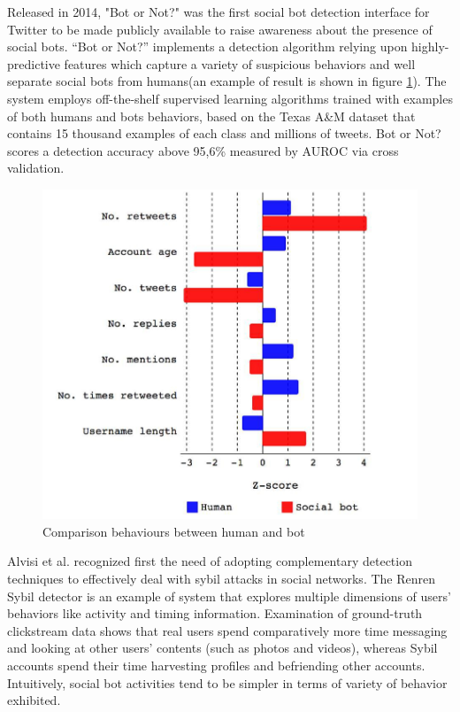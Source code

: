 \documentclass[conference, onecolumn]{IEEEtran}
\begin{document}
Released in 2014, "Bot or Not?" was the first social bot detection interface for Twitter to be made publicly available to raise awareness about the presence of social bots. “Bot or Not?” implements a detection algorithm relying upon highly-predictive features which capture a variety of suspicious behaviors and well separate social bots from humans(an example of result is shown in figure \ref{fig:tweetbot}). The system employs off-the-shelf supervised learning algorithms trained with examples of both humans and bots behaviors, based on the Texas A\&M dataset that contains 15 thousand examples of each class and millions of tweets. Bot or Not? scores a detection accuracy above 95,6\% measured by AUROC via cross validation.
\begin{figure} [!htbp]
	\centering
	\vspace{0.3cm}
	\includegraphics[scale=0.7]{images/tweetbot}
	\caption{Comparison behaviours between human and bot}
	\vspace{0.3cm}
	\label{fig:tweetbot}
\end{figure}
\medskip

Alvisi et al. recognized first the need of adopting complementary detection techniques to effectively deal with sybil attacks in social networks. The Renren Sybil detector is an example of system that explores multiple dimensions of users' behaviors like activity and timing information. Examination of ground-truth clickstream data shows that real users spend comparatively more time messaging and looking at other users' contents (such as photos and videos), whereas Sybil accounts spend their time harvesting profiles and befriending other accounts. Intuitively, social bot activities tend to be simpler in terms of variety of behavior exhibited.
\medskip
\end{document}
